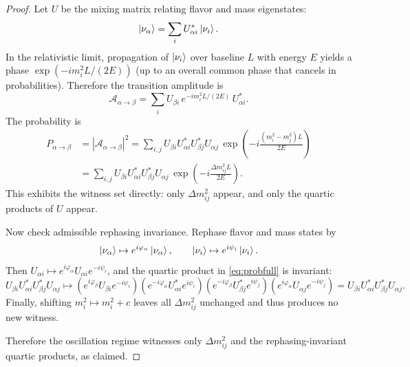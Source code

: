 \documentclass[11pt]{article}
\theoremstyle{remark}
\begin{document}
\begin{proof}
Let $U$ be the mixing matrix relating flavor and mass eigenstates:
\begin{equation}\label{eq:mix}
\ket{\nu_\alpha}=\sum_i U_{\alpha i}^\ast \ket{\nu_i}.
\end{equation}
In the relativistic limit, propagation of $\ket{\nu_i}$ over baseline $L$ with energy $E$ yields a phase
$\exp(-i m_i^2 L/(2E))$ (up to an overall common phase that cancels in probabilities). Therefore the
transition amplitude is
\begin{equation}\label{eq:amp}
\mathcal{A}_{\alpha\to\beta}
=
\sum_i U_{\beta i}\,e^{-i m_i^2 L/(2E)}\,U_{\alpha i}^\ast.
\end{equation}
The probability is
\begin{align}\label{eq:probfull}
P_{\alpha\to\beta}
&=
|\mathcal{A}_{\alpha\to\beta}|^2
=
\sum_{i,j}U_{\beta i}U_{\alpha i}^\ast U_{\beta j}^\ast U_{\alpha j}\,
\exp\!\left(-i\frac{(m_i^2-m_j^2)L}{2E}\right)\\
&=
\sum_{i,j}U_{\beta i}U_{\alpha i}^\ast U_{\beta j}^\ast U_{\alpha j}\,
\exp\!\left(-i\frac{\Delta m^2_{ij}L}{2E}\right).\nonumber
\end{align}
This exhibits the witness set directly: only $\Delta m^2_{ij}$ appear, and only the quartic products
of $U$ appear.

Now check admissible rephasing invariance. Rephase flavor and mass states by
\begin{equation}
\ket{\nu_\alpha}\mapsto e^{i\varphi_\alpha}\ket{\nu_\alpha},
\qquad
\ket{\nu_i}\mapsto e^{i\psi_i}\ket{\nu_i}.
\end{equation}
Then $U_{\alpha i}\mapsto e^{i\varphi_\alpha}U_{\alpha i}e^{-i\psi_i}$, and the quartic product in
\eqref{eq:probfull} is invariant:
\begin{equation}
U_{\beta i}U_{\alpha i}^\ast U_{\beta j}^\ast U_{\alpha j}
\mapsto
(e^{i\varphi_\beta}U_{\beta i}e^{-i\psi_i})
(e^{-i\varphi_\alpha}U_{\alpha i}^\ast e^{i\psi_i})
(e^{-i\varphi_\beta}U_{\beta j}^\ast e^{i\psi_j})
(e^{i\varphi_\alpha}U_{\alpha j}e^{-i\psi_j})
=
U_{\beta i}U_{\alpha i}^\ast U_{\beta j}^\ast U_{\alpha j}.
\end{equation}
Finally, shifting $m_i^2\mapsto m_i^2+c$ leaves all $\Delta m^2_{ij}$ unchanged and thus produces no
new witness.

Therefore the oscillation regime witnesses only $\Delta m^2_{ij}$ and the rephasing-invariant quartic
products, as claimed.
\end{proof}
\end{document}
